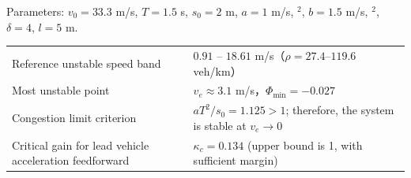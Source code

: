 \documentclass[11pt,a4paper,openany]{book}
\numberwithin{equation}{chapter}
\numberwithin{figure}{chapter}
\numberwithin{table}{chapter}
\begin{document}
Parameters: $v_0=33.3$ m/s, $T=1.5$ s, $s_0=2$ m, $a=1$ m/s, $^2$, $b=1.5$ m/s, $^2$, $\delta=4$, $l=5$ m.










\begin{center}
\small
{}
\label{tab:idm-number-summary}
\begin{tabular}{p{6.4cm}p{7.4cm}}
\toprule







Reference unstable speed band




& $0.91$ -- $18.61$ m/s（$\rho=27.4$--$119.6$ veh/km） \\







Most unstable point




& $v_e\approx3.1$ m/s，$\Phi_{\min}=-0.027$ \\







Congestion limit criterion




&




 $aT^2/s_0=1.125>1$; therefore, the system is stable at $v_e\to0$



\\
\midrule







Critical gain for lead vehicle acceleration feedforward




&




 $\kappa_c=0.134$ (upper bound is 1, with sufficient margin)



\\








\end{tabular}
\end{center}
\end{document}
